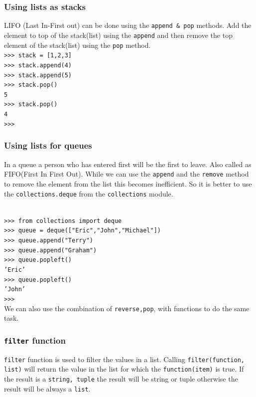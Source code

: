 \documentclass[12pt,a4paper]{article}
\begin{document}
\subsubsection{Using lists as stacks}
LIFO (Last In-First out) can be done using the \texttt{append \& pop} methods. Add the element to top of  the stack(list) using the \texttt{append} and then remove the top element of the stack(list) using the \texttt{pop} method.
\texttt{\\
>>> stack = [1,2,3]\\
>>> stack.append(4)\\
>>> stack.append(5)\\
>>> stack.pop()\\
5\\
>>> stack.pop()\\
4\\
>>>
}
\subsubsection{Using lists for queues}
In a queue a person who has entered first will be the first to leave. Also called as FIFO(First In First Out). While we can use the \texttt{append} and the \texttt{remove} method to remove the element from the list this becomes inefficient. So it is better to use the \texttt{collections.deque} from the \texttt{collections} module. 

\texttt{\\
>>> from collections import deque\\
>>> queue = deque(["Eric","John","Michael"])\\
>>> queue.append("Terry")\\
>>> queue.append("Graham")\\
>>> queue.popleft()\\
'Eric'\\
>>> queue.popleft()\\
'John'\\
>>> \\ }
We can also use the combination of \texttt{reverse,pop}, with functions to do the same task.
\subsubsection{\texttt{filter} function}
\texttt{filter} function is used to filter the values in a list. Calling \texttt{filter(function, list)} will return the value in the list for which the \texttt{function(item)} is true. If the result is a \texttt{string, tuple} the result will be string or tuple otherwise the result will be always a \texttt{list}.
\end{document}
